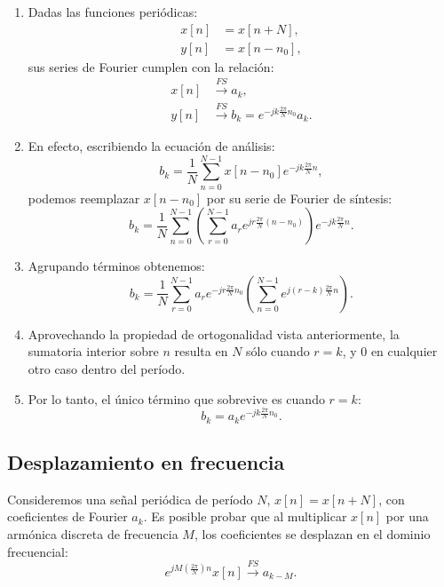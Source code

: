 \documentclass[11pt,a4paper,openany]{book}
\begin{document}
\begin{enumerate}
	\item Dadas las funciones periódicas:
	\begin{align}
		x[n] &= x[n+N], \\
		y[n] &= x[n-n_{0}],
	\end{align}
	sus series de Fourier cumplen con la relación:
	\begin{align}
		x[n] &\xrightarrow{FS} a_{k}, \\
		y[n] &\xrightarrow{FS} b_{k} = e^{-jk\frac{2\pi}{N}n_{0}} a_{k}.
	\end{align}
	
	\item En efecto, escribiendo la ecuación de análisis:
	\begin{equation}
		b_{k} = \frac{1}{N} \sum_{n=0}^{N-1} x[n-n_{0}] e^{-jk\frac{2\pi}{N}n},
	\end{equation}
	podemos reemplazar $x[n-n_0]$ por su serie de Fourier de síntesis:
	\begin{equation}
		b_{k} = \frac{1}{N} \sum_{n=0}^{N-1} \left( \sum_{r=0}^{N-1} a_{r} e^{jr\frac{2\pi}{N}(n-n_{0})} \right) e^{-jk\frac{2\pi}{N}n}.
	\end{equation}
	
	\item Agrupando términos obtenemos:
	\begin{equation}
		b_{k} = \frac{1}{N} \sum_{r=0}^{N-1} a_{r} e^{-jr\frac{2\pi}{N}n_{0}} \left( \sum_{n=0}^{N-1} e^{j(r-k)\frac{2\pi}{N}n} \right).
	\end{equation}
	
	\item Aprovechando la propiedad de ortogonalidad vista anteriormente, la sumatoria interior sobre $n$ resulta en $N$ sólo cuando $r = k$, y $0$ en cualquier otro caso dentro del período.
	\item Por lo tanto, el único término que sobrevive es cuando $r=k$:
	\begin{equation}
		b_{k} = a_{k} e^{-jk\frac{2\pi}{N}n_{0}}.
	\end{equation}
\end{enumerate}

\subsection{Desplazamiento en frecuencia}

Consideremos una señal periódica de período $N$, $x[n] = x[n+N]$, con coeficientes de Fourier $a_{k}$. Es posible probar que al multiplicar $x[n]$ por una armónica discreta de frecuencia $M$, los coeficientes se desplazan en el dominio frecuencial:
\begin{equation}
	e^{jM\left(\frac{2\pi}{N}\right)n} x[n] \xrightarrow{FS} a_{k-M}.
\end{equation}
\end{document}
